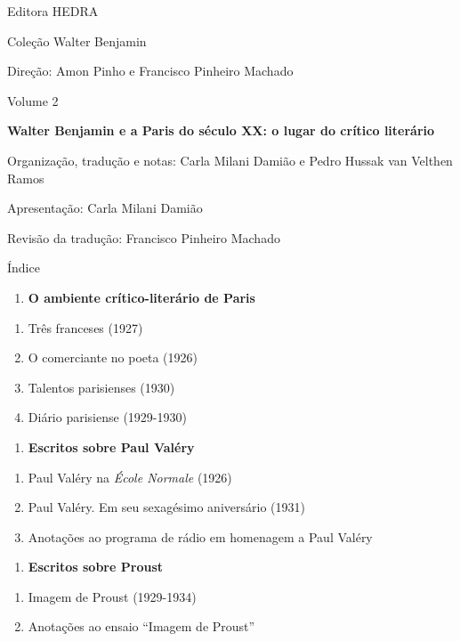 Editora HEDRA

Coleção Walter Benjamin

Direção: Amon Pinho e Francisco Pinheiro Machado

Volume 2

\textbf{Walter Benjamin e a Paris do século XX: o lugar do crítico
literário}

Organização, tradução e notas: Carla Milani Damião e Pedro Hussak van
Velthen Ramos

Apresentação: Carla Milani Damião

Revisão da tradução: Francisco Pinheiro Machado

Índice

\begin{enumerate}
\def\labelenumi{\Roman{enumi}.}
\item
  \textbf{O ambiente crítico-literário de Paris}
\end{enumerate}

\begin{enumerate}
\def\labelenumi{\arabic{enumi}.}
\item
  Três franceses (1927)
\item
  O comerciante no poeta (1926)
\item
  Talentos parisienses (1930)
\item
  Diário parisiense (1929-1930)
\end{enumerate}

\begin{enumerate}
\def\labelenumi{\Roman{enumi}.}
\setcounter{enumi}{1}
\item
  \textbf{Escritos sobre Paul Valéry}
\end{enumerate}

\begin{enumerate}
\def\labelenumi{\arabic{enumi}.}
\setcounter{enumi}{4}
\item
  Paul Valéry na \emph{École Normale} (1926)
\item
  Paul Valéry. Em seu sexagésimo aniversário (1931)
\item
  Anotações ao programa de rádio em homenagem a Paul Valéry
\end{enumerate}

\begin{enumerate}
\def\labelenumi{\Roman{enumi}.}
\setcounter{enumi}{2}
\item
  \textbf{Escritos sobre Proust}
\end{enumerate}

\begin{enumerate}
\def\labelenumi{\arabic{enumi}.}
\setcounter{enumi}{7}
\item
  Imagem de Proust (1929-1934)
\item
  Anotações ao ensaio ``Imagem de Proust''
\end{enumerate}

